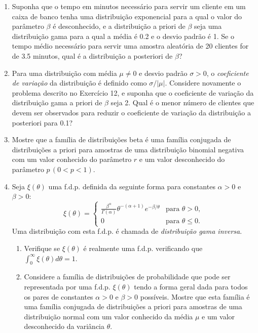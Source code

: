 \begin{enumerate}
    \item Suponha que o tempo em minutos necessário para servir um cliente em um caixa de banco tenha uma distribuição exponencial para a qual o valor do parâmetro $\beta$ é desconhecido, e a distribuição a priori de $\beta$ seja uma distribuição gama para a qual a média é 0.2 e o desvio padrão é 1. Se o tempo médio necessário para servir uma amostra aleatória de 20 clientes for de 3.5 minutos, qual é a distribuição a posteriori de $\beta$?
    
    \item Para uma distribuição com média $\mu \ne 0$ e desvio padrão $\sigma>0$, o \textit{coeficiente de variação} da distribuição é definido como $\sigma/|\mu|$. Considere novamente o problema descrito no Exercício 12, e suponha que o coeficiente de variação da distribuição gama a priori de $\beta$ seja 2. Qual é o menor número de clientes que devem ser observados para reduzir o coeficiente de variação da distribuição a posteriori para 0.1?
    
    \item Mostre que a família de distribuições beta é uma família conjugada de distribuições a priori para amostras de uma distribuição binomial negativa com um valor conhecido do parâmetro $r$ e um valor desconhecido do parâmetro $p \, (0<p<1)$.
    
    \item Seja $\xi(\theta)$ uma f.d.p. definida da seguinte forma para constantes $\alpha > 0$ e $\beta > 0$:
    $$ \xi(\theta) = 
    \begin{cases}
        \frac{\beta^\alpha}{\Gamma(\alpha)}\theta^{-(\alpha+1)}e^{-\beta/\theta} & \text{para } \theta>0, \\
        0 & \text{para } \theta \le 0.
    \end{cases}
    $$
    Uma distribuição com esta f.d.p. é chamada de \textit{distribuição gama inversa}.
    \begin{enumerate}[label=(\alph*)]
        \item Verifique se $\xi(\theta)$ é realmente uma f.d.p. verificando que $\int_0^\infty \xi(\theta)d\theta = 1$.
        \item Considere a família de distribuições de probabilidade que pode ser representada por uma f.d.p. $\xi(\theta)$ tendo a forma geral dada para todos os pares de constantes $\alpha>0$ e $\beta>0$ possíveis. Mostre que esta família é uma família conjugada de distribuições a priori para amostras de uma distribuição normal com um valor conhecido da média $\mu$ e um valor desconhecido da variância $\theta$.
    \end{enumerate}
    

\end{enumerate}
